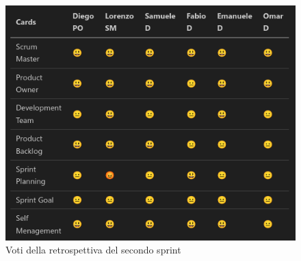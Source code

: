 \documentclass{article}
\begin{document}
\begin{figure}[H]
    \centering
    \includegraphics[width=1\textwidth]{retrospettiva2}
    \caption{Voti della retrospettiva del secondo sprint}
    \label{fig:retrospettiva2}
\end{figure}
\end{document}
